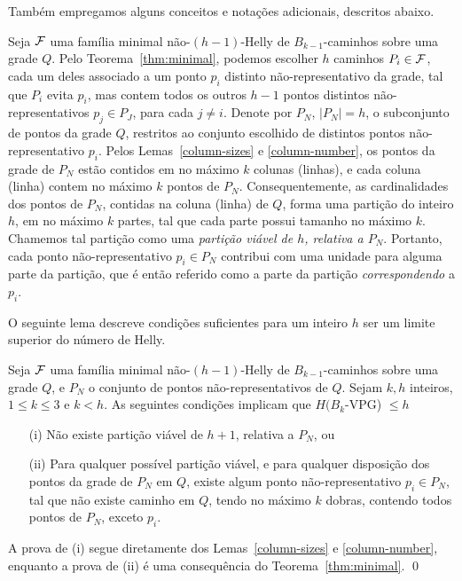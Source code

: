Também empregamos alguns conceitos e notações adicionais, descritos abaixo.

Seja $\cal F$ uma família minimal não-$(h-1)$-Helly  de $B_{k-1}$-caminhos sobre uma grade $Q$. Pelo Teorema~\ref{thm:minimal},  podemos escolher $h$ caminhos $P_i \in {\cal F}$, cada um deles associado a um ponto $p_i$ distinto não-representativo da grade, tal que $P_i$ evita $p_i$, mas contem todos os outros  $h-1$ pontos distintos não-representativos  $p_j \in P_J$, para cada $j \neq i$. Denote por $P_N$, $|P_N|=h$, o subconjunto de pontos da grade $Q$, restritos ao conjunto escolhido de distintos pontos  não-representativo $p_i$. Pelos Lemas~\ref{column-sizes} e \ref{column-number}, os pontos da grade de $P_N$ estão contidos em no máximo $k$ colunas (linhas), e cada  coluna (linha) contem no máximo $k$ pontos de $P_N$. Consequentemente, as cardinalidades dos pontos de $P_N$, contidas na coluna (linha) de $Q$,  forma uma partição  do inteiro $h$, em no máximo $k$ partes, tal que cada  parte possui tamanho no máximo  $k$. Chamemos tal partição como uma {\it partição viável de $h$, relativa a $P_N$}. Portanto, cada ponto não-representativo $p_i \in P_N$ contribui com uma unidade para alguma parte da partição, que é então referido como a parte da partição  {\it correspondendo} a $p_i$.    

O seguinte lema descreve condições suficientes para um inteiro $h$ ser um limite superior do número de Helly.

\begin{lemma}\label{upper-bound} Seja $\cal F$ uma família minimal não-$(h-1)$-Helly de $B_{k-1}$-caminhos sobre uma grade $Q$, e $P_N$ o conjunto de pontos não-representativos de $Q$. Sejam $k,h$ inteiros, $1 \leq k \leq 3$ e $k < h$. As seguintes condições implicam que $H(B_k$-VPG) $\leq h$  
\begin{itemize}
    \item[(i)] Não existe partição viável de $h+1$, relativa a $P_N$, ou 
    \item[(ii)] Para qualquer possível partição viável, e para qualquer disposição dos pontos da grade de $P_N$ em $Q$, existe algum ponto não-representativo  $p_i \in P_N$, tal que não existe caminho em $Q$, tendo no máximo  $k$ dobras, contendo todos pontos de $P_N$, exceto $p_i$.    
\end{itemize}
\end{lemma}
\proof A prova de (i) segue diretamente dos Lemas~\ref{column-sizes} e \ref{column-number}, enquanto a prova de (ii) é uma consequência do Teorema~\ref{thm:minimal}.  \qed \\

